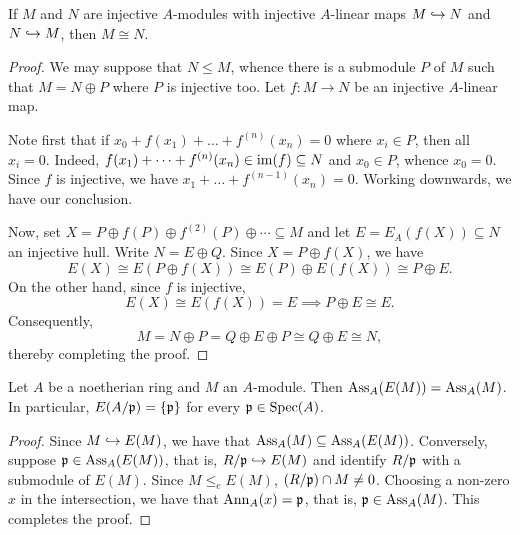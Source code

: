\begin{theorem}
    If $M$ and $N$ are injective $A$-modules with injective $A$-linear maps $M\hookrightarrow N$ and $N\hookrightarrow M$, then $M\cong N$.
\end{theorem}
\begin{proof}
    We may suppose that $N\le M$, whence there is a submodule $P$ of $M$ such that $M = N\oplus P$ where $P$ is injective too. Let $f: M\to N$ be an injective $A$-linear map.

    Note first that if $x_0 + f(x_1) + \dots + f^{(n)}(x_n) = 0$ where $x_i\in P$, then all $x_i = 0$. Indeed, $f(x_1) + \dots + f^{(n)}(x_n)\in\operatorname{im}(f)\subseteq N$ and $x_0\in P$, whence $x_0 = 0$. Since $f$ is injective, we have $x_1 + \dots + f^{(n - 1)}(x_n) = 0$. Working downwards, we have our conclusion. 

    Now, set $X = P\oplus f(P)\oplus f^{(2)}(P)\oplus\cdots\subseteq M$ and let $E = E_A(f(X))\subseteq N$ an injective hull. Write $N = E\oplus Q$. Since $X = P\oplus f(X)$, we have 
    \begin{equation*}
        E(X)\cong E(P\oplus f(X))\cong E(P)\oplus E(f(X))\cong P\oplus E.
    \end{equation*}
    On the other hand, since $f$ is injective,
    \begin{equation*}
        E(X)\cong E(f(X)) = E\implies P\oplus E\cong E.
    \end{equation*}
    Consequently,
    \begin{equation*}
        M = N\oplus P = Q\oplus E\oplus P\cong Q\oplus E\cong N,
    \end{equation*}
    thereby completing the proof.
\end{proof}

\begin{proposition}
    Let $A$ be a noetherian ring and $M$ an $A$-module. Then $\operatorname{Ass}_A(E(M)) = \operatorname{Ass}_A(M)$. In particular, $E(A/\mathfrak{p}) = \{\mathfrak{p}\}$ for every $\mathfrak{p}\in\operatorname{Spec}(A)$.
\end{proposition}
\begin{proof}
    Since $M\hookrightarrow E(M)$, we have that $\operatorname{Ass}_A(M)\subseteq\operatorname{Ass}_A(E(M))$. Conversely, suppose $\mathfrak{p}\in\operatorname{Ass}_A(E(M))$, that is, $R/\mathfrak{p}\hookrightarrow E(M)$ and identify $R/\mathfrak{p}$ with a submodule of $E(M)$. Since $M\le_e E(M)$, $(R/\mathfrak{p})\cap M\ne 0$. Choosing a non-zero $x$ in the intersection, we have that $\operatorname{Ann}_A(x) = \mathfrak{p}$, that is, $\mathfrak{p}\in\operatorname{Ass}_A(M)$. This completes the proof.
\end{proof}

